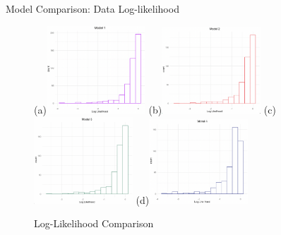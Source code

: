 \documentclass{beamer}
\begin{document}
\begin{frame}{Model Comparison: Data Log-likelihood}
    \begin{figure}[h!]
        \centering
        
        \subfigure(a){\includegraphics[width=0.33\textwidth]{plots/model1_llm.png}} 
        \subfigure(b){\includegraphics[width=0.33\textwidth]{plots/model2_llm.png}} 
        \subfigure(c){\includegraphics[width=0.33\textwidth]{plots/model3_llm.png}}
        \subfigure(d){\includegraphics[width=0.33\textwidth]{plots/model4_llm.png}}
      
        \caption{Log-Likelihood Comparison}
      
   
      \end{figure}  
\end{frame}
\end{document}

